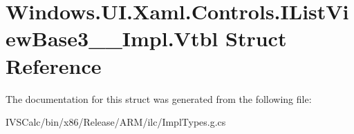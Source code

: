 \hypertarget{struct_windows_1_1_u_i_1_1_xaml_1_1_controls_1_1_i_list_view_base3_____impl_1_1_vtbl}{}\section{Windows.\+U\+I.\+Xaml.\+Controls.\+I\+List\+View\+Base3\+\_\+\+\_\+\+Impl.\+Vtbl Struct Reference}
\label{struct_windows_1_1_u_i_1_1_xaml_1_1_controls_1_1_i_list_view_base3_____impl_1_1_vtbl}


The documentation for this struct was generated from the following file\+:\begin{DoxyCompactItemize}
\item 
I\+V\+S\+Calc/bin/x86/\+Release/\+A\+R\+M/ilc/Impl\+Types.\+g.\+cs\end{DoxyCompactItemize}
